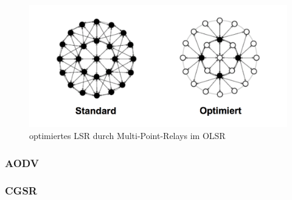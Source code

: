 \begin{figure}[H] 
	\centering
	\includegraphics[scale=0.5]{Bilder/olsr}
	\caption{optimiertes LSR durch Multi-Point-Relays im OLSR\cite{d:timm}}
	\label{f:olsr}
\end{figure}

\subsubsection{AODV}\label{ss:AODV}

\subsubsection{CGSR}\label{ss:CGSR}

